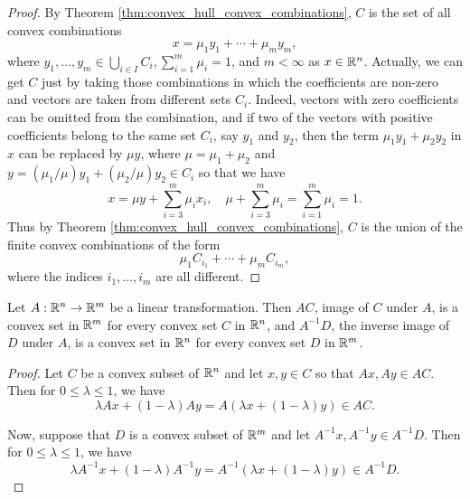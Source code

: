 \documentclass[11pt,a4paper]{article}
\begin{document}
\begin{proof}
    By Theorem \ref{thm:convex_hull_convex_combinations}, $C$ is the set of all convex combinations 
    \begin{equation*}
        x = \mu_1 y_1+\cdots + \mu_m y_m,
    \end{equation*}
    where $y_1,\ldots,y_m\in \bigcup_{i\in I} C_i, \sum_{i=1}^m \mu_i = 1$, and $m<\infty$ as $x\in\mathbb{R}^n$. Actually, we can get $C$ just by taking those combinations in which the coefficients are non-zero and vectors are taken from different sets $C_i$. Indeed, vectors with zero coefficients can be omitted from the combination, and if two of the vectors with positive coefficients belong to the same set $C_i$, say $y_1$ and $y_2$, then the term $\mu_1 y_1+\mu_2 y_2$ in $x$ can be replaced by $\mu y$, where $\mu = \mu_1+\mu_2$ and $y = (\mu_1/\mu)y_1 + (\mu_2/\mu)y_2\in C_i$ so that we have
    \begin{equation*}
        x = \mu y + \sum_{i=3}^m \mu_i x_i,\quad \mu+\sum_{i=3}^m \mu_i = \sum_{i=1}^m \mu_i = 1. 
    \end{equation*}
    Thus by Theorem \ref{thm:convex_hull_convex_combinations}, $C$ is the union of the finite convex combinations of the form 
    \begin{equation*}
        \mu_1 C_{i_1} + \cdots + \mu_m C_{i_m},
    \end{equation*} 
    where the indices $i_1,\ldots,i_m$ are all different. 
\end{proof}

\begin{theorem}\label{thm:convex_set_under_linear_transformation}
    Let $A:\mathbb{R}^n\rightarrow \mathbb{R}^m$ be a linear transformation. Then $AC$, image of $C$ under $A$, is a convex set in $\mathbb{R}^m$ for every convex set $C$ in $\mathbb{R}^n$, and $A^{-1}D$, the inverse image of $D$ under $A$, is a convex set in $\mathbb{R}^n$ for every convex set $D$ in $\mathbb{R}^m$.
\end{theorem}

\begin{proof}
    Let $C$ be a convex subset of $\mathbb{R}^n$ and let $x,y\in C$ so that $Ax,Ay\in AC$. Then for $0\le \lambda \le 1$, we have 
    \begin{equation*}
        \lambda Ax + (1-\lambda) A y = A(\lambda x+(1-\lambda)y) \in AC.
    \end{equation*}

    \noindent Now, suppose that $D$ is a convex subset of $\mathbb{R}^m$ and let $A^{-1}x,A^{-1}y\in A^{-1}D$. Then for $0\le \lambda\le 1$, we have
    \begin{equation*}
        \lambda A^{-1}x + (1-\lambda)A^{-1}y = A^{-1}(\lambda x + (1-\lambda) y) \in A^{-1}D.
    \end{equation*}
\end{proof}
\end{document}
